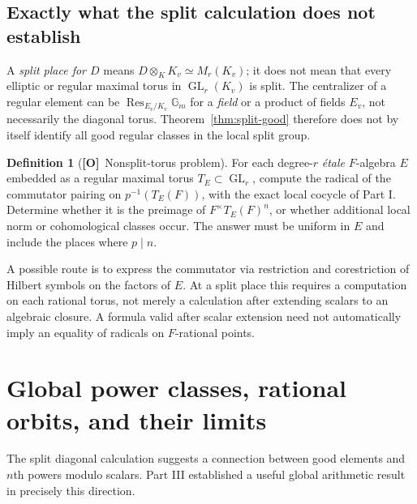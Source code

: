 \documentclass[11pt]{article}
\newcommand{\GL}{\operatorname{GL}}
\newcommand{\Otag}{\textnormal{\textbf{[O]}}}
\theoremstyle{plain}
\theoremstyle{definition}
\newtheorem{definition}[theorem]{Definition}
\begin{document}
\subsection{Exactly what the split calculation does not establish}
A \emph{split place for $D$} means $D\otimes_KK_v\simeq M_r(K_v)$;
it does not mean that every elliptic or regular maximal torus in
$\GL_r(K_v)$ is split.  The centralizer of a regular element can be
$\operatorname{Res}_{E_v/K_v}\mathbb G_m$ for a \emph{field} or a
product of fields $E_v$, not necessarily the diagonal torus.
Theorem~\ref{thm:split-good} therefore does not by itself identify
all good regular classes in the local split group.

\begin{definition}[\Otag\ Nonsplit-torus problem]\label{def:nonsplit}
For each degree-$r$ \emph{\'etale} $F$-algebra $E$ embedded as a
regular maximal torus $T_E\subset\GL_r$, compute the radical of the
commutator pairing on $p^{-1}(T_E(F))$, with the exact local cocycle of
Part I.  Determine whether it is the preimage of
$F^\times T_E(F)^n$, or whether additional local norm or cohomological
classes occur.  The answer must be uniform in $E$ and include the
places where $p\mid n$.
\end{definition}

A possible route is to express the commutator via restriction and
corestriction of Hilbert symbols on the factors of $E$.  At a split
place this requires a computation on each rational torus, not merely
a calculation after extending scalars to an algebraic closure.
A formula valid after scalar extension need not automatically imply
an equality of radicals on $F$-rational points.

\section{Global power classes, rational orbits, and their limits}\label{sec:global}
The split diagonal calculation suggests a connection between good
elements and $n$th powers modulo scalars.  Part III established a
useful global arithmetic result in precisely this direction.
\end{document}
